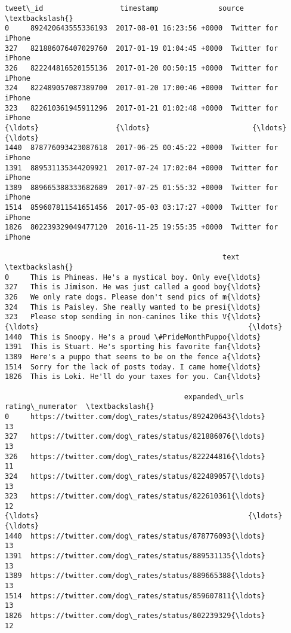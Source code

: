 \documentclass[11pt]{article}
\makeatletter
\newcommand{\boxspacing}{\kern\kvtcb@left@rule\kern\kvtcb@boxsep}
\newcommand{\prompt}[4]{
        \ttfamily\llap{{\color{#2}[#3]:\hspace{3pt}#4}}\vspace{-\baselineskip}
    }
\makeatother
\begin{document}
            \begin{tcolorbox}[breakable, size=fbox, boxrule=.5pt, pad at break*=1mm, opacityfill=0]
\prompt{Out}{outcolor}{115}{\boxspacing}
\begin{Verbatim}[commandchars=\\\{\}]
                tweet\_id                  timestamp              source  \textbackslash{}
0     892420643555336193  2017-08-01 16:23:56 +0000  Twitter for iPhone
327   821886076407029760  2017-01-19 01:04:45 +0000  Twitter for iPhone
326   822244816520155136  2017-01-20 00:50:15 +0000  Twitter for iPhone
324   822489057087389700  2017-01-20 17:00:46 +0000  Twitter for iPhone
323   822610361945911296  2017-01-21 01:02:48 +0000  Twitter for iPhone
{\ldots}                  {\ldots}                        {\ldots}                 {\ldots}
1440  878776093423087618  2017-06-25 00:45:22 +0000  Twitter for iPhone
1391  889531135344209921  2017-07-24 17:02:04 +0000  Twitter for iPhone
1389  889665388333682689  2017-07-25 01:55:32 +0000  Twitter for iPhone
1514  859607811541651456  2017-05-03 03:17:27 +0000  Twitter for iPhone
1826  802239329049477120  2016-11-25 19:55:35 +0000  Twitter for iPhone

                                                   text  \textbackslash{}
0     This is Phineas. He's a mystical boy. Only eve{\ldots}
327   This is Jimison. He was just called a good boy{\ldots}
326   We only rate dogs. Please don't send pics of m{\ldots}
324   This is Paisley. She really wanted to be presi{\ldots}
323   Please stop sending in non-canines like this V{\ldots}
{\ldots}                                                 {\ldots}
1440  This is Snoopy. He's a proud \#PrideMonthPuppo{\ldots}
1391  This is Stuart. He's sporting his favorite fan{\ldots}
1389  Here's a puppo that seems to be on the fence a{\ldots}
1514  Sorry for the lack of posts today. I came home{\ldots}
1826  This is Loki. He'll do your taxes for you. Can{\ldots}

                                          expanded\_urls  rating\_numerator  \textbackslash{}
0     https://twitter.com/dog\_rates/status/892420643{\ldots}                13
327   https://twitter.com/dog\_rates/status/821886076{\ldots}                13
326   https://twitter.com/dog\_rates/status/822244816{\ldots}                11
324   https://twitter.com/dog\_rates/status/822489057{\ldots}                13
323   https://twitter.com/dog\_rates/status/822610361{\ldots}                12
{\ldots}                                                 {\ldots}               {\ldots}
1440  https://twitter.com/dog\_rates/status/878776093{\ldots}                13
1391  https://twitter.com/dog\_rates/status/889531135{\ldots}                13
1389  https://twitter.com/dog\_rates/status/889665388{\ldots}                13
1514  https://twitter.com/dog\_rates/status/859607811{\ldots}                13
1826  https://twitter.com/dog\_rates/status/802239329{\ldots}                12


\end{Verbatim}
\end{tcolorbox}
\end{document}
